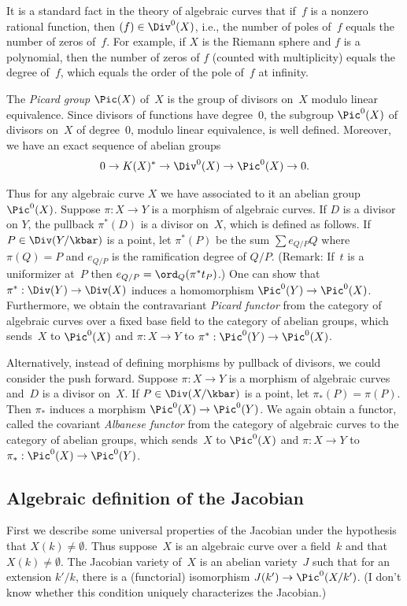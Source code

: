 \documentclass{report}
\begin{document}
It is a standard fact in the theory of algebraic curves that
if~$f$ is a nonzero rational function, then $(f)\in \Div^0(X)$,
i.e., the number of poles of~$f$ equals the number of zeros
of~$f$.  For example, if $X$ is the Riemann sphere and $f$ is a
polynomial, then the number of zeros of $f$ (counted with
multiplicity) equals the degree of~$f$, which equals the order of
the pole of~$f$ at infinity.

The {\em Picard group} $\Pic(X)$ of~$X$ is the group of divisors
on~$X$ modulo linear equivalence.  Since divisors of functions
have degree~$0$, the subgroup $\Pic^0(X)$ of divisors on~$X$ of
degree~$0$, modulo linear equivalence, is well defined.  Moreover,
we have an exact sequence of abelian groups
\[
  0 \to K(X)^* \to \Div^0(X) \to \Pic^0(X) \to 0.
\]

Thus for any algebraic curve $X$ we have associated to it an
abelian group $\Pic^0(X)$.   Suppose $\pi: X\to Y$ is a morphism
of algebraic curves.  If $D$ is a divisor on $Y$, the pullback
$\pi^*(D)$ is a divisor on~$X$, which is defined as follows.  If
$P\in \Div(Y/\kbar)$ is a point, let $\pi^*(P)$ be the sum $\sum
e_{Q/P} Q$ where $\pi(Q)=P$ and $e_{Q/P}$ is the ramification
degree of $Q/P$.  (Remark: If~$t$ is a uniformizer at~$P$ then
$e_{Q/P}=\ord_Q(\pi^*t_{P})$.)   One can show that
$\pi^*:\Div(Y)\to \Div(X)$ induces a homomorphism $\Pic^0(Y)\to
\Pic^0(X)$.   Furthermore, we obtain the contravariant {\em Picard
functor} from the category of algebraic curves over a fixed base
field to the category of abelian groups, which sends~$X$ to
$\Pic^0(X)$ and $\pi:X\to Y$ to $\pi^*:\Pic^0(Y)\to \Pic^0(X)$.

Alternatively, instead of defining morphisms by pullback of
divisors, we could consider the push forward.  Suppose $\pi:X\to
Y$ is a morphism of algebraic curves and~$D$ is a divisor on~$X$.
If $P\in \Div(X/\kbar)$ is a point, let $\pi_*(P)=\pi(P)$.  Then
$\pi_*$ induces a morphism $\Pic^0(X)\to \Pic^0(Y)$.  We again
obtain a functor, called the covariant {\em Albanese functor} from
the category of algebraic curves to the category of abelian
groups, which sends~$X$ to $\Pic^0(X)$ and $\pi:X\to Y$ to
$\pi_*:\Pic^0(X)\to \Pic^0(Y)$.

\subsection{Algebraic definition of the Jacobian}

First we describe some universal properties of the Jacobian under
the hypothesis that $X(k)\neq \emptyset$.  Thus suppose~$X$ is an
algebraic curve over a field~$k$ and that $X(k)\neq \emptyset$.
The Jacobian variety of~$X$ is an abelian variety~$J$ such that
for an extension $k'/k$, there is a (functorial) isomorphism
$J(k')\to \Pic^0(X/k')$.  (I don't know whether this condition
uniquely characterizes the Jacobian.)
\end{document}
